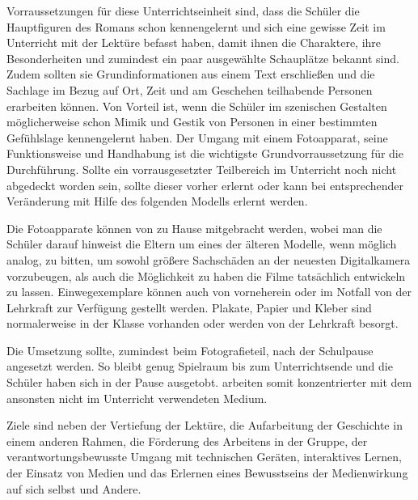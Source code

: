 Vorraussetzungen für diese Unterrichtseinheit sind, dass die Schüler die Hauptfiguren des Romans schon kennengelernt und sich eine gewisse Zeit im Unterricht mit der Lektüre befasst haben, damit ihnen die Charaktere, ihre Besonderheiten und zumindest ein paar ausgewählte Schauplätze bekannt sind. Zudem sollten sie  Grundinformationen aus einem Text erschließen und die Sachlage im Bezug auf Ort, Zeit und am Geschehen teilhabende Personen erarbeiten können. Von Vorteil ist, wenn die Schüler im szenischen Gestalten möglicherweise schon Mimik und Gestik von Personen in einer bestimmten Gefühlslage kennengelernt haben. Der Umgang mit einem Fotoapparat, seine Funktionsweise und Handhabung ist die wichtigste Grundvorraussetzung für die Durchführung. Sollte ein vorrausgesetzter Teilbereich im Unterricht noch nicht abgedeckt worden sein, sollte dieser vorher erlernt oder kann bei entsprechender Veränderung mit Hilfe des folgenden Modells erlernt werden.

Die Fotoapparate können von zu Hause mitgebracht werden, wobei man die Schüler darauf hinweist die Eltern um eines der älteren Modelle, wenn möglich analog, zu bitten, um sowohl größere Sachschäden an der neuesten Digitalkamera vorzubeugen, als auch die Möglichkeit zu haben die Filme tatsächlich entwickeln zu lassen. Einwegexemplare können auch von vorneherein oder im Notfall von der Lehrkraft zur Verfügung gestellt werden. 
Plakate, Papier und Kleber sind normalerweise in der Klasse vorhanden oder werden von der Lehrkraft besorgt.

Die Umsetzung sollte, zumindest beim Fotografieteil, nach der Schulpause angesetzt werden. So bleibt genug Spielraum bis zum Unterrichtsende und die Schüler haben sich in der Pause ausgetobt. arbeiten somit konzentrierter mit dem ansonsten nicht im Unterricht verwendeten Medium.

Ziele sind neben der Vertiefung der Lektüre, die Aufarbeitung der Geschichte in einem anderen Rahmen, die Förderung des Arbeitens in der Gruppe, der verantwortungsbewusste Umgang mit technischen Geräten, interaktives Lernen, der Einsatz von Medien und das Erlernen eines Bewusstseins der Medienwirkung auf sich selbst und Andere.

